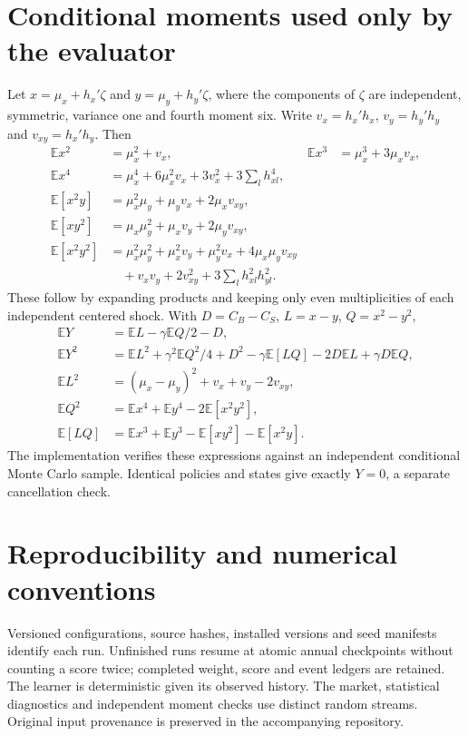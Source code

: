 \documentclass[11pt,a4paper]{article}
\theoremstyle{remark}\newtheorem{remark}[theorem]{Remark}
\newcommand{\E}{\mathbb E}\newcommand{\Prb}{\mathbb P}
\begin{document}
\section{Conditional moments used only by the evaluator}
Let $x=\mu_x+h_x'\zeta$ and $y=\mu_y+h_y'\zeta$, where the components of
$\zeta$ are independent, symmetric, variance one and fourth moment six.
Write $v_x=h_x'h_x$, $v_y=h_y'h_y$ and $v_{xy}=h_x'h_y$. Then
\begin{align*}
 \E x^2&=\mu_x^2+v_x,&\E x^3&=\mu_x^3+3\mu_xv_x,\\
 \E x^4&=\mu_x^4+6\mu_x^2v_x+3v_x^2+3\sum_lh_{xl}^4,\\
 \E[x^2y]&=\mu_x^2\mu_y+\mu_yv_x+2\mu_xv_{xy},\\
 \E[xy^2]&=\mu_x\mu_y^2+\mu_xv_y+2\mu_yv_{xy},\\
 \E[x^2y^2]&=\mu_x^2\mu_y^2+\mu_x^2v_y+\mu_y^2v_x+4\mu_x\mu_yv_{xy}\\
 &\quad+v_xv_y+2v_{xy}^2+3\sum_lh_{xl}^2h_{yl}^2.
\end{align*}
These follow by expanding products and keeping only even multiplicities of
each independent centered shock. With $D=C_B-C_S$, $L=x-y$, $Q=x^2-y^2$,
\begin{align*}
 \E Y&=\E L-\gamma\E Q/2-D,\\
 \E Y^2&=\E L^2+\gamma^2\E Q^2/4+D^2
             -\gamma\E[LQ]-2D\E L+\gamma D\E Q,\\
 \E L^2&=(\mu_x-\mu_y)^2+v_x+v_y-2v_{xy},\\
 \E Q^2&=\E x^4+\E y^4-2\E[x^2y^2],\\
 \E[LQ]&=\E x^3+\E y^3-\E[xy^2]-\E[x^2y].
\end{align*}
The implementation verifies these expressions against an independent
conditional Monte Carlo sample. Identical policies and states give exactly
$Y=0$, a separate cancellation check.





\section{Reproducibility and numerical conventions}
Versioned configurations, source hashes, installed versions and seed manifests
identify each run. Unfinished runs resume at atomic annual checkpoints without
counting a score twice; completed weight, score and event ledgers are retained.
The learner is deterministic given its observed history. The market,
statistical diagnostics and independent moment checks use distinct random
streams. Original input provenance is preserved in the accompanying repository.
\end{document}
